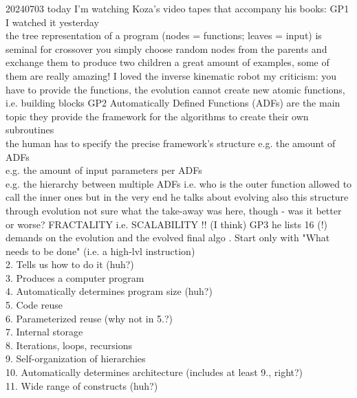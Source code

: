 \documentclass{article}\usepackage[margin=2cm]{geometry}
\begin{document}
\begin{cascade}
    20240703
    \stepin
    today I'm watching Koza's video tapes that accompany his books:
    GP1
    \stepin
    I watched it yesterday\\
    the tree representation of a program (nodes = functions; leaves = input) is seminal for crossover
    \stepin
    you simply choose random nodes from the parents and exchange them to produce two children
    \stepout
    a great amount of examples, some of them are really amazing!
    \stepin
    I loved the inverse kinematic robot
    \stepout
    my criticism:
    \stepin
    you have to provide the functions, the evolution cannot create new atomic functions, i.e. building blocks
    \stepout
    \stepout
    GP2
    \stepin
    Automatically Defined Functions (ADFs) are the main topic
    \stepin
    they provide the framework for the algorithms to create their own subroutines\\
    the human has to specify the precise framework's structure
    \stepin
    e.g. the amount of ADFs\\
    e.g. the amount of input parameters per ADFs\\
    e.g. the hierarchy between multiple ADFs
    \stepin
    i.e. who is the outer function allowed to call the inner ones
    \stepout
    but in the very end he talks about evolving also this structure through evolution
    \stepin
    not sure what the take-away was here, though - was it better or worse?
    \stepout
    \stepout
    FRACTALITY i.e. SCALABILITY !! (I think)
    \stepout
    \stepout
    GP3
    \stepin
    he lists 16 (!) demands on the evolution and the evolved final algo
    . Start only with "What needs to be done" (i.e. a high-lvl instruction)\\
    2. Tells us how to do it (huh?)\\
    3. Produces a computer program\\
    4. Automatically determines program size (huh?)\\
    5. Code reuse\\
    6. Parameterized reuse (why not in 5.?)\\
    7. Internal storage\\
    8. Iterations, loops, recursions\\
    9. Self-organization of hierarchies\\
    10. Automatically determines architecture (includes at least 9., right?)\\
    11. Wide range of constructs (huh?)\\

\end{cascade}
\end{document}

